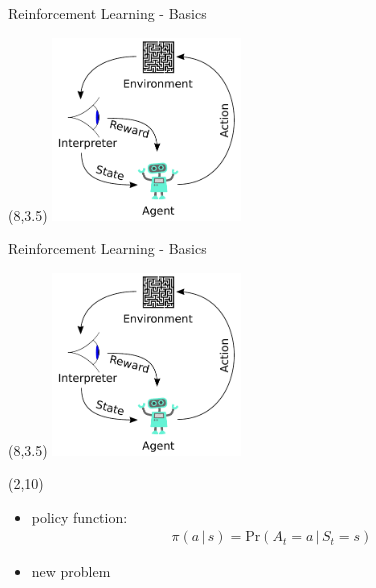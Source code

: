 \documentclass{beamer}
\begin{document}
\begin{frame}{Reinforcement Learning - Basics}
\begin{textblock}{20}(8,3.5)
\includegraphics[width = 5cm]{Images/rl_basics.pdf}
\end{textblock}
\end{frame}
\begin{frame}{Reinforcement Learning - Basics}

\begin{textblock}{20}(8,3.5)
\includegraphics[width = 5cm]{Images/rl_basics.pdf}
\end{textblock}

\begin{textblock}{7}(2,10)
\begin{itemize}

\item {policy function:
	\begin{align*}
	\pi(a\,|\,s)=\mathrm{Pr}(A_t = a \,| \,S_t = s)
	\end{align*}}
\item new problem
\end{itemize}
\end{textblock}
\end{frame}
\end{document}

